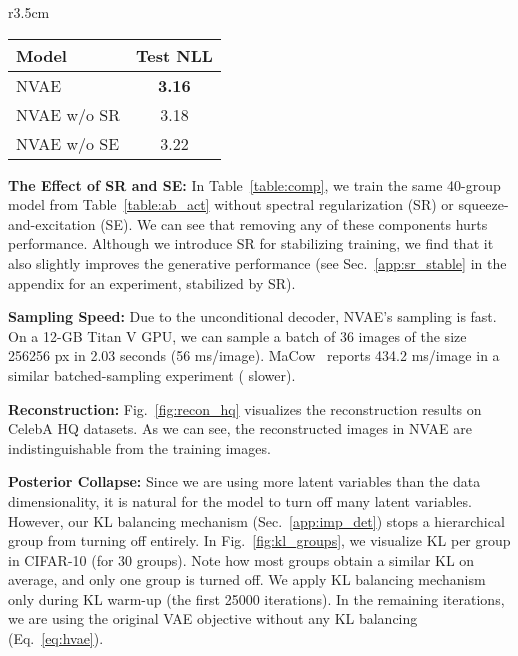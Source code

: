 \documentclass{article}
\begin{document}
\begin{wraptable}{r}{3.5cm}
\vspace{-5mm}
\centering
{\footnotesize
\setlength{\tabcolsep}{2pt}
\caption{\small SR \& SE}\label{table:comp}
    \begin{tabular}{lc}
    \toprule
    Model    & Test NLL  \\
    \midrule
    NVAE          & \bf 3.16  \\
    NVAE w/o SR     & 3.18 \\
    NVAE w/o SE     & 3.22  \\
    \bottomrule
    \end{tabular}
}
\vspace{-8mm}
\end{wraptable}\textbf{The Effect of SR and SE:} In Table~\ref{table:comp}, we train the same 40-group model from Table~\ref{table:ab_act} without spectral regularization (SR) or squeeze-and-excitation (SE). We can see that removing any of these components hurts performance. Although we introduce SR for stabilizing training, we find that it also slightly improves the generative performance (see Sec.~\ref{app:sr_stable} in the appendix for an experiment, stabilized by SR).


\textbf{Sampling Speed:} Due to the unconditional decoder, NVAE's sampling is fast. On a 12-GB Titan V GPU, we can sample a batch of 36 images of the size 256256 px in 2.03 seconds (56 ms/image). MaCow~\cite{ma19MaCow} reports 434.2 ms/image in a similar batched-sampling experiment ( slower). 

\textbf{Reconstruction:}
Fig.~\ref{fig:recon_hq} visualizes the reconstruction results on CelebA HQ datasets. As we can see, the reconstructed images in NVAE are indistinguishable from the training images. 

\textbf{Posterior Collapse:}
Since we are using more latent variables than the data dimensionality, it is natural for the model to turn off many latent variables. However, our KL balancing mechanism (Sec.~\ref{app:imp_det}) stops a hierarchical group from turning off entirely. In Fig.~\ref{fig:kl_groups}, we visualize KL per group in CIFAR-10 (for 30 groups). Note how most groups obtain a similar KL on average, and only one group is turned off. We apply KL balancing mechanism only during KL warm-up (the first  25000 iterations). In the remaining iterations, we are using the original VAE objective without any KL balancing (Eq.~\ref{eq:hvae}).
\end{document}
